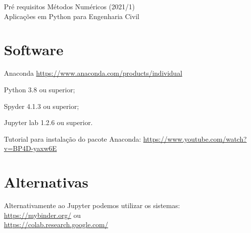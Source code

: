 \documentclass[12pt]{article}
\begin{document}
\noindent Pré requisitos \hfill Métodos Numéricos (2021/1) \\
Aplicações em Python para Engenharia Civil

\hrulefill

  \section*{Software}
  \begin{todolist}
    \item Anaconda \url{https://www.anaconda.com/products/individual}
    \begin{todolist}
      \item Python 3.8 ou superior;
      \item Spyder 4.1.3 ou superior;
      \item Jupyter lab 1.2.6 ou superior.
    \end{todolist}
  \end{todolist}

Tutorial para instalação do pacote Anaconda: \url{https://www.youtube.com/watch?v=BP4D-yaxw6E}

\section*{Alternativas}
Alternativamente ao Jupyter podemos utilizar os sistemas:\\ \url{https://mybinder.org/} ou \\ \url{https://colab.research.google.com/}
\end{document}
